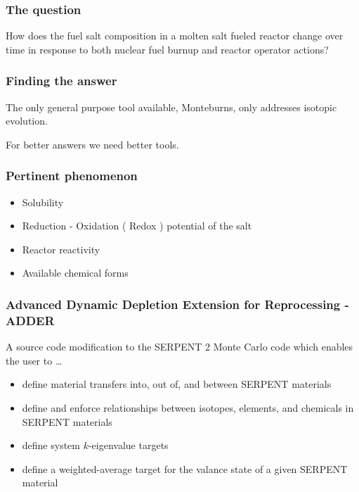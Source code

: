\documentclass{beamer}
\begin{document}
\begin{frame}
\frametitle{The question}

How does the fuel salt composition in a molten salt fueled reactor change over
time in response to both nuclear fuel burnup and reactor operator actions?

\end{frame}

\begin{frame}
\frametitle{Finding the answer}

The only general purpose tool available, Monteburns, only addresses isotopic
evolution.

\hspace{2cm}

For better answers we need better tools.

\end{frame}

\begin{frame}
\frametitle{Pertinent phenomenon}

    \begin{itemize}
        \item Solubility
        \item Reduction - Oxidation ( Redox ) potential of the salt
        \item Reactor reactivity
        \item Available chemical forms
    \end{itemize}

\end{frame}

\begin{frame}
\frametitle{Advanced Dynamic Depletion Extension for Reprocessing - ADDER}

A source code modification to the SERPENT 2 Monte Carlo code which enables the
user to \ldots

    \begin{itemize}
        \item define material transfers into, out of, and between SERPENT materials
        \item define and enforce relationships between isotopes, elements, and chemicals in SERPENT materials
        \item define system $k$-eigenvalue targets
        \item define a weighted-average target for the valance state of a given SERPENT material
    \end{itemize}

\end{frame}
\end{document}
